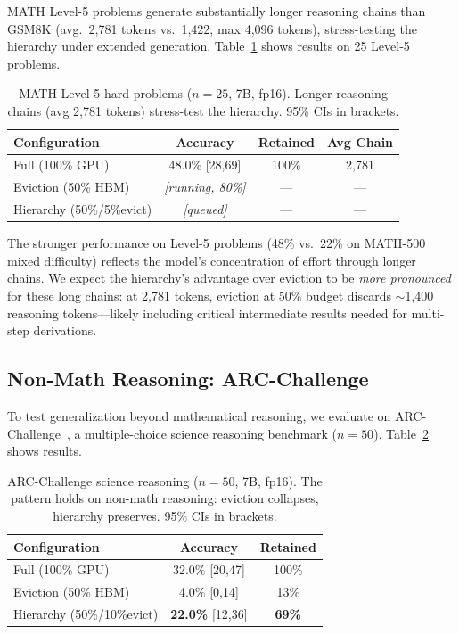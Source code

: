 \documentclass{article}
\begin{document}
MATH Level-5 problems generate substantially longer reasoning chains than GSM8K (avg.\ 2,781 tokens vs.\ 1,422, max 4,096 tokens), stress-testing the hierarchy under extended generation.
Table~\ref{tab:aime} shows results on 25 Level-5 problems.

\begin{table}[t]
\centering
\caption{MATH Level-5 hard problems ($n=25$, 7B, fp16). Longer reasoning chains (avg 2,781 tokens) stress-test the hierarchy. 95\% CIs in brackets.}
\label{tab:aime}
\vskip 0.1in
\begin{tabular}{lccc}
\toprule
\textbf{Configuration} & \textbf{Accuracy} & \textbf{Retained} & \textbf{Avg Chain} \\
\midrule
Full (100\% GPU) & 48.0\% {\scriptsize[28,69]} & 100\% & 2,781 \\
Eviction (50\% HBM) & \textit{[running, 80\%]} & --- & --- \\
Hierarchy (50\%/5\%evict) & \textit{[queued]} & --- & --- \\
\bottomrule
\end{tabular}
\end{table}

The stronger performance on Level-5 problems (48\% vs.\ 22\% on MATH-500 mixed difficulty) reflects the model's concentration of effort through longer chains.
We expect the hierarchy's advantage over eviction to be \emph{more pronounced} for these long chains: at 2,781 tokens, eviction at 50\% budget discards ${\sim}$1,400 reasoning tokens---likely including critical intermediate results needed for multi-step derivations.

\subsection{Non-Math Reasoning: ARC-Challenge}
\label{sec:arc}

To test generalization beyond mathematical reasoning, we evaluate on ARC-Challenge~\cite{arc}, a multiple-choice science reasoning benchmark ($n{=}50$).
Table~\ref{tab:arc} shows results.

\begin{table}[t]
\centering
\caption{ARC-Challenge science reasoning ($n=50$, 7B, fp16). The pattern holds on non-math reasoning: eviction collapses, hierarchy preserves. 95\% CIs in brackets.}
\label{tab:arc}
\vskip 0.1in
\begin{tabular}{lcc}
\toprule
\textbf{Configuration} & \textbf{Accuracy} & \textbf{Retained} \\
\midrule
Full (100\% GPU) & 32.0\% {\scriptsize[20,47]} & 100\% \\
Eviction (50\% HBM) & 4.0\% {\scriptsize[0,14]} & 13\% \\
Hierarchy (50\%/10\%evict) & \textbf{22.0\%} {\scriptsize[12,36]} & \textbf{69\%} \\
\bottomrule
\end{tabular}
\end{table}
\end{document}
